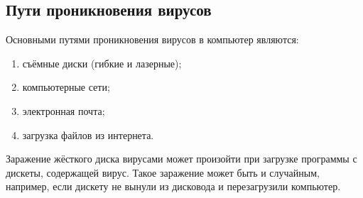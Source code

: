 \subsection{Пути проникновения вирусов}
 
Основными путями проникновения вирусов в компьютер являются:
 
\begin{enumerate}
    \item съёмные диски (гибкие и лазерные);
    \item компьютерные сети;
    \item электронная почта;
    \item загрузка файлов из интернета.
\end{enumerate}
 
Заражение жёсткого диска вирусами может произойти при загрузке программы с дискеты, содержащей вирус. Такое заражение может быть и случайным, например, если дискету не вынули из дисковода и перезагрузили компьютер.